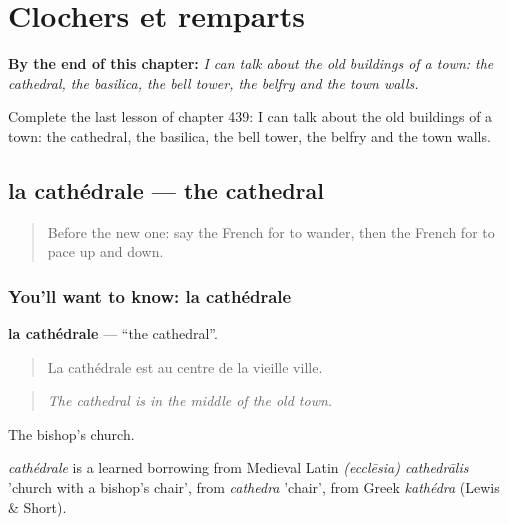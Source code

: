 
\chapter{Clochers et remparts}
\label{ch:fr-clochers-et-remparts}

\begin{chapteropening}
\textbf{By the end of this chapter:} \emph{I can talk about the old buildings of a town: the cathedral, the basilica, the bell tower, the belfry and the town walls.}

Complete the last lesson of chapter 439: I can talk about the old buildings of a town: the cathedral, the basilica, the bell tower, the belfry and the town walls.
\end{chapteropening}

\section[la cathédrale]{la cathédrale — the cathedral}

\label{lesson:FR-C439-cathedrale}



\begin{quote}
Before the new one: say the French for to wander, then the French for to pace up and down.
\end{quote}

\subsection*{You'll want to know: la cathédrale}
\textbf{la cathédrale} — \textquotedblleft{}the cathedral\textquotedblright{}.

\begin{quote}
La cathédrale est au centre de la vieille ville.
\end{quote}

\begin{quote}
\emph{The cathedral is in the middle of the old town.}
\end{quote}

The bishop's church.

\begin{cousinweb}
\emph{cathédrale} is a learned borrowing from Medieval Latin \emph{(ecclēsia) cathedrālis} 'church with a bishop's chair', from \emph{cathedra} 'chair', from Greek \emph{kathédra} (Lewis \& Short).
\end{cousinweb}

